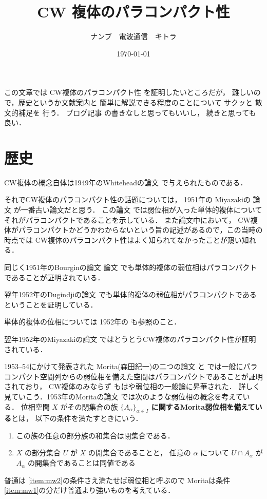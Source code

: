 \documentclass[leqno, a4paper, 12pt]{jsarticle}
\title{CW 複体のパラコンパクト性}
\author{ナンブ　電波通信　キトラ}
\date{\today}
\begin{document}
\maketitle




この文章では
CW複体のパラコンパクト性
を証明したいところだが，
難しいので，歴史というか文献案内と
簡単に解説できる程度のことについて
サクッと
散文的補足を
行う．
ブログ記事
\cite{Den5}の書きなしと思ってもいいし，
続きと思っても良い．


\tableofcontents


\section{歴史}

CW複体の概念自体は1949年のWhiteheadの論文
\cite{MR0030759}
で与えられたものである．

それでCW複体のパラコンパクト性の話題については，
1951年の
Miyazakiの
論文
\cite{MR0048793}
が一番古い論文だと思う．
この論文
\cite{MR0048793}
では弱位相が入った単体的複体について
それがパラコンパクトであることを示している．
また論文中において，
CW複体がパラコンパクトかどうかわからないという旨の記述があるので，この当時の時点では
CW複体のパラコンパクト性はよく知られてなかったことが窺い知れる．

同じく1951年のBourginの論文
論文
\cite{MR0048794}
でも単体的複体の弱位相はパラコンパクトであることが証明されている．

翌年1952年のDugindjiの論文
\cite{MR0048821}
でも単体的複体の弱位相がパラコンパクトであるということを証明している．

単体的複体の位相については
1952年の
\cite{dowker1952topology}
も参照のこと．


翌年1952年のMiyazakiの論文
\cite{MR0054246}
ではとうとうCW複体のパラコンパクト性が証明されている．

1953--54にかけて発表された
Morita(森田紀一)の二つの論文\cite{MR0062423}
と\cite{MR0069478}
では一般にパラコンパクト空間列からの弱位相を備えた空間はパラコンパクトであることが証明されており，
CW複体のみならず
もはや弱位相の一般論に昇華された．
詳しく見ていこう．1953年のMoritaの論文
\cite{MR0062423}では次のような弱位相の概念を考えている．
位相空間
$X$
がその閉集合の族
\textbf{$\{A_{\alpha}\}_{\alpha \in I}$
に関するMorita弱位相を備えている}とは，
以下の条件を満たすときにいう．
\begin{enumerate}[label=\textup{(\arabic*)}]
\item\label{item:mw1}
この族の任意の部分族の和集合は閉集合である．
\item\label{item:mw2}
$X$
の部分集合
$U$
が
$X$
の開集合であることと，
任意の
$\alpha$
について
$U\cap A_{\alpha}$
が
$A_{\alpha}$
の開集合であることは同値である
\end{enumerate}
普通は
\ref{item:mw2}の条件さえ満たせば弱位相と呼ぶので
Moritaは条件\ref{item:mw1}の分だけ普通より強いものを考えている．
\end{document}
